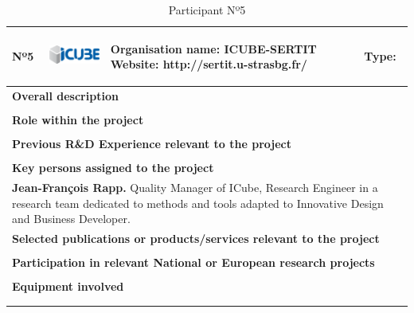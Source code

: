 \begin{longtable}[H]{|p{0.7cm}|p{4cm}|p{7cm}|p{1.3cm}|}
	\hline
	\begin{center} Nº5 \end{center} & \begin{center} \includegraphics[scale=0.6]{./logos/Icube_web} \end{center} & \begin{center} \textbf{Organisation name:} ICUBE-SERTIT \newline \textbf{Website:} http://sertit.u-strasbg.fr/ \end{center} & \begin{center} Type: \end{center} \\ \hline
	
	\multicolumn{4}{|p{13cm}|}{\textbf{Overall description}}  \\ \hline
	
	\multicolumn{4}{|p{13cm}|}{}  \\ \hline
	
	\multicolumn{4}{|p{13cm}|}{\textbf{Role within the project}}   \\ \hline
	
	\multicolumn{4}{|p{13cm}|}{}  \\ \hline
	
	\multicolumn{4}{|p{13cm}|}{\textbf{Previous R\&D Experience relevant to the project}}  \\ \hline
	
	\multicolumn{4}{|p{13cm}|}{}  \\ \hline
	
	\multicolumn{4}{|p{13cm}|}{\textbf{Key persons assigned to the project}}   \\ \hline
	
	\multicolumn{4}{|p{13cm}|}{\textbf{Jean-François Rapp.} Quality Manager of ICube, Research Engineer in a research team dedicated to methods and tools adapted to Innovative Design and Business Developer.  } \\ \hline
	
	\multicolumn{4}{|p{13cm}|}{\textbf{Selected publications or products/services relevant to the project}}  \\ \hline
	
	\multicolumn{4}{|p{13cm}|}{}  \\ \hline
	
	\multicolumn{4}{|p{13cm}|}{\textbf{Participation in relevant National or European research projects}}  \\ \hline
	
	\multicolumn{4}{|p{13cm}|}{}  \\ \hline
	
	\multicolumn{4}{|p{13cm}|}{\textbf{Equipment involved}}  \\ \hline
	
	\multicolumn{4}{|p{13cm}|}{}  \\ \hline
	\caption{Participant Nº5}
\end{longtable}

